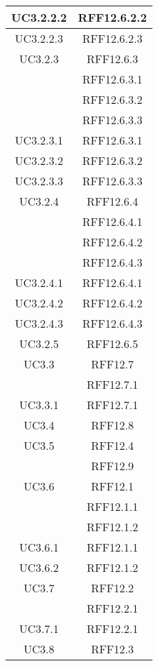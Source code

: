 \begin{longtable}{|c|c|}
\midrule
UC3.2.2.2
& RFF12.6.2.2\\

\midrule
UC3.2.2.3
& RFF12.6.2.3\\

\midrule
UC3.2.3
& RFF12.6.3\\
& RFF12.6.3.1\\
& RFF12.6.3.2\\
& RFF12.6.3.3\\

\midrule
UC3.2.3.1
& RFF12.6.3.1\\

\midrule
UC3.2.3.2
& RFF12.6.3.2\\

\midrule
UC3.2.3.3
& RFF12.6.3.3\\

\midrule
UC3.2.4
& RFF12.6.4\\
& RFF12.6.4.1\\
& RFF12.6.4.2\\
& RFF12.6.4.3\\

\midrule
UC3.2.4.1
& RFF12.6.4.1\\

\midrule
UC3.2.4.2
& RFF12.6.4.2\\

\midrule
UC3.2.4.3
& RFF12.6.4.3\\

\midrule
UC3.2.5
& RFF12.6.5\\

\midrule
UC3.3
& RFF12.7\\
& RFF12.7.1\\

\midrule
UC3.3.1
& RFF12.7.1\\

\midrule
UC3.4
& RFF12.8\\

\midrule
UC3.5
& RFF12.4\\
& RFF12.9\\

\midrule
UC3.6
& RFF12.1\\
& RFF12.1.1\\
& RFF12.1.2\\

\midrule
UC3.6.1
& RFF12.1.1\\

\midrule
UC3.6.2
& RFF12.1.2\\

\midrule
UC3.7
& RFF12.2\\
& RFF12.2.1\\

\midrule
UC3.7.1
& RFF12.2.1\\

\midrule
UC3.8
& RFF12.3\\

\end{longtable}